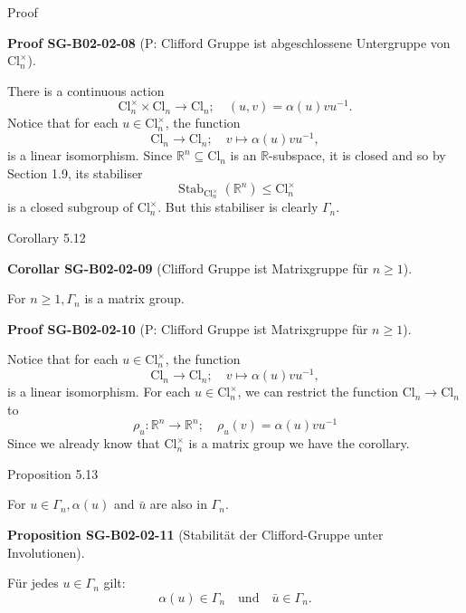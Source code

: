 \documentclass[10pt, letterpaper]{article}
\newcommand{\Cl}{\mathrm{Cl}}
\newcommand{\CustomHeading}[3]{%
  \par\medskip\noindent%
  \textbf{#1 #2} \textnormal{(#3)}.\enskip%
}
\newenvironment{PROP}[2]{\begin{unitbox}\CustomHeading{Proposition}{#1}{#2}}{\end{unitbox}}
\newenvironment{KORO}[2]{\begin{unitbox}\CustomHeading{Corollar}{#1}{#2}}{\end{unitbox}}
\newenvironment{PROOF}[2]{\begin{unitbox}\CustomHeading{Proof}{#1}{#2}}{\end{unitbox}}
\begin{document}
Proof

\begin{PROOF}{SG-B02-02-08}{P: Clifford Gruppe ist abgeschlossene Untergruppe von $\Cl_n^\times$}
There is a continuous action
$$
\mathrm{Cl}_{n}^{\times} \times \mathrm{Cl}_{n} \longrightarrow \mathrm{Cl}_{n} ; \quad(u, v)=\alpha(u) v u^{-1} .
$$
Notice that for each $u \in \mathrm{Cl}_{n}^{\times}$, the function
$$
\mathrm{Cl}_{n} \longrightarrow \mathrm{Cl}_{n} ; \quad v \longmapsto \alpha(u) v u^{-1},
$$
is a linear isomorphism. Since $\mathbb{R}^{n} \subseteq \mathrm{Cl}_{n}$ is an $\mathbb{R}$-subspace, it is closed and so by Section 1.9, its stabiliser
$$
\operatorname{Stab}_{\mathrm{Cl}_{n}^{\times}}\left(\mathbb{R}^{n}\right) \leqslant \mathrm{Cl}_{n}^{\times}
$$
is a closed subgroup of $\mathrm{Cl}_{n}^{\times}$. But this stabiliser is clearly $\Gamma_{n}$.
\end{PROOF}





Corollary 5.12

\begin{KORO}{SG-B02-02-09}{Clifford Gruppe ist Matrixgruppe für $n\geq 1$}
For $n \geqslant 1, \Gamma_{n}$ is a matrix group.
\end{KORO}


\begin{PROOF}{SG-B02-02-10}{P: Clifford Gruppe ist Matrixgruppe für $n\geq 1$}
Notice that for each $u \in \mathrm{Cl}_{n}^{\times}$, the function
$$
\mathrm{Cl}_{n} \longrightarrow \mathrm{Cl}_{n} ; \quad v \longmapsto \alpha(u) v u^{-1},
$$
is a linear isomorphism. For each $u \in \mathrm{Cl}_{n}^{\times}$, we can restrict the function $\mathrm{Cl}_{n} \longrightarrow \mathrm{Cl}_{n}$ to
$$
\rho_{u}: \mathbb{R}^{n} \longrightarrow \mathbb{R}^{n} ; \quad \rho_{u}(v)=\alpha(u) v u^{-1}
$$
Since we already know that $\mathrm{Cl}_{n}^{\times}$ is a matrix group we have the corollary.
\end{PROOF}


Proposition 5.13

For $u \in \Gamma_{n}, \alpha(u)$ and $\bar{u}$ are also in $\Gamma_{n}$.



\begin{PROP}{SG-B02-02-11}{Stabilität der Clifford-Gruppe unter Involutionen}
Für jedes \(u \in \Gamma_n\) gilt:
\[
\alpha(u) \in \Gamma_n
\quad \text{und} \quad
\bar{u} \in \Gamma_n .
\]
\end{PROP}
\end{document}
